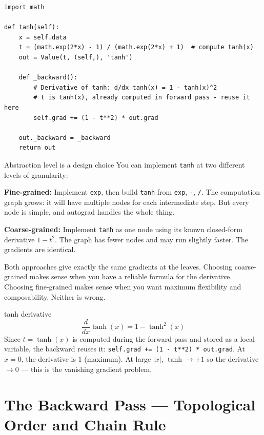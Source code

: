 \documentclass[12pt,a4paper]{article}
\newcommand{\code}[1]{\texttt{\small\color{deepblue}#1}}
\begin{document}
\begin{lstlisting}
import math

def tanh(self):
    x = self.data
    t = (math.exp(2*x) - 1) / (math.exp(2*x) + 1)  # compute tanh(x)
    out = Value(t, (self,), 'tanh')

    def _backward():
        # Derivative of tanh: d/dx tanh(x) = 1 - tanh(x)^2
        # t is tanh(x), already computed in forward pass - reuse it here
        self.grad += (1 - t**2) * out.grad

    out._backward = _backward
    return out
\end{lstlisting}

\begin{codeexplainbox}{Abstraction level is a design choice}
You can implement \code{tanh} at two different levels of granularity:

\textbf{Fine-grained:} Implement \code{exp}, then build \code{tanh} from \code{exp}, \code{-}, \code{/}. The computation graph grows: it will have multiple nodes for each intermediate step. But every node is simple, and autograd handles the whole thing.

\textbf{Coarse-grained:} Implement \code{tanh} as one node using its known closed-form derivative $1 - t^2$. The graph has fewer nodes and may run slightly faster. The gradients are identical.

Both approaches give exactly the same gradients at the leaves. Choosing coarse-grained makes sense when you have a reliable formula for the derivative. Choosing fine-grained makes sense when you want maximum flexibility and composability. Neither is wrong.
\end{codeexplainbox}

\begin{mathbox}{tanh derivative}
\[
\frac{d}{dx}\tanh(x) = 1 - \tanh^2(x)
\]
Since $t = \tanh(x)$ is computed during the forward pass and stored as a local variable, the backward reuses it: \code{self.grad += (1 - t**2) * out.grad}. At $x=0$, the derivative is 1 (maximum). At large $|x|$, $\tanh \to \pm 1$ so the derivative $\to 0$ — this is the vanishing gradient problem.
\end{mathbox}

\section{The Backward Pass — Topological Order and Chain Rule}
\end{document}
